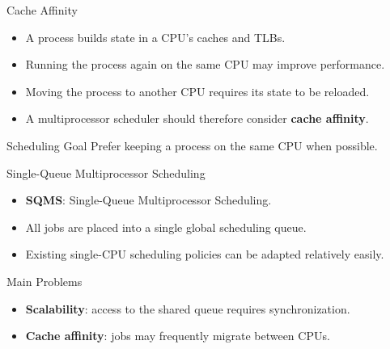 \begin{frame}{Cache Affinity}

\begin{itemize}
    \item A process builds state in a CPU's caches and TLBs.

    \item Running the process again on the same CPU may improve performance.

    \item Moving the process to another CPU requires its state to be
    reloaded.

    \item A multiprocessor scheduler should therefore consider
    \textbf{cache affinity}.
\end{itemize}

\vspace{0.3cm}

\begin{block}{Scheduling Goal}
Prefer keeping a process on the same CPU when possible.
\end{block}

\end{frame}

\begin{frame}{Single-Queue Multiprocessor Scheduling}

\begin{itemize}
    \item \textbf{SQMS}: Single-Queue Multiprocessor Scheduling.

    \item All jobs are placed into a single global scheduling queue.

    \item Existing single-CPU scheduling policies can be adapted relatively
    easily.
\end{itemize}

\vspace{0.3cm}

\begin{block}{Main Problems}
\begin{itemize}
    \item \textbf{Scalability}: access to the shared queue requires
    synchronization.

    \item \textbf{Cache affinity}: jobs may frequently migrate between CPUs.
\end{itemize}
\end{block}


\end{frame}

